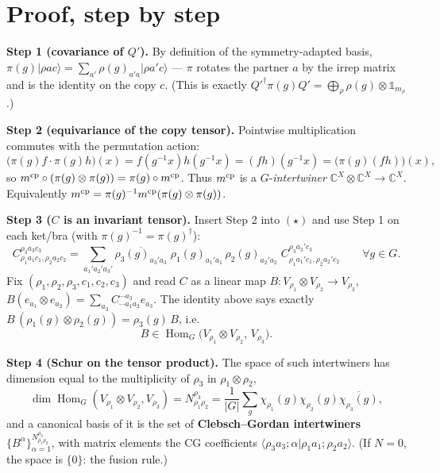 \documentclass[11pt]{article}
\newcommand{\ket}[1]{\lvert #1\rangle}\newcommand{\bra}[1]{\langle #1\rvert}
\newcommand{\Hom}{\operatorname{Hom}}\newcommand{\C}{\mathbb C}
\theoremstyle{plain}\newtheorem*{thm}{Theorem}\newtheorem*{lem}{Lemma}
\begin{document}
\section{Proof, step by step}

\textbf{Step 1 (covariance of $Q'$).} By definition of the symmetry-adapted basis,
$\pi(g)\ket{\rho a c}=\sum_{a'}\rho(g)_{a'a}\ket{\rho a' c}$ --- $\pi$ rotates the partner $a$ by the
irrep matrix and is the identity on the copy $c$. (This is exactly $Q'^\dagger\pi(g)Q'=\bigoplus_\rho
\rho(g)\otimes\mathbb 1_{m_\rho}$.)

\textbf{Step 2 (equivariance of the copy tensor).} Pointwise multiplication commutes with the
permutation action:
\[
   \big(\pi(g)f\cdot\pi(g)h\big)(x)=f(g^{-1}x)h(g^{-1}x)=(fh)(g^{-1}x)=\big(\pi(g)(fh)\big)(x),
\]
so $m^{\rm cp}\circ(\pi(g)\otimes\pi(g))=\pi(g)\circ m^{\rm cp}$. Thus $m^{\rm cp}$ is a
$G$-\emph{intertwiner} $\C^X\otimes\C^X\to\C^X$. Equivalently $m^{\rm cp}=\pi(g)^{-1}m^{\rm cp}(\pi(g)\otimes\pi(g))$.

\textbf{Step 3 ($C$ is an invariant tensor).} Insert Step 2 into $(\star)$ and use Step 1 on each
ket/bra (with $\pi(g)^{-1}=\pi(g)^\dagger$):
\[
   C^{\rho_3 a_3 c_3}_{\rho_1 a_1 c_1,\rho_2 a_2 c_2}
   =\sum_{a_1'a_2'a_3'}\overline{\rho_3(g)_{a_3'a_3}}\;\rho_1(g)_{a_1'a_1}\,\rho_2(g)_{a_2'a_2}\;
   C^{\rho_3 a_3' c_3}_{\rho_1 a_1' c_1,\rho_2 a_2' c_2}\qquad\forall g\in G.
\]
Fix $(\rho_1,\rho_2,\rho_3,c_1,c_2,c_3)$ and read $C$ as a linear map
$B:V_{\rho_1}\otimes V_{\rho_2}\to V_{\rho_3}$, $B(e_{a_1}\otimes e_{a_2})=\sum_{a_3}C^{\cdots a_3}_{\cdots a_1 a_2}e_{a_3}$.
The identity above says exactly $B\,(\rho_1(g)\otimes\rho_2(g))=\rho_3(g)\,B$, i.e.
\[
   B\in\Hom_G\!\big(V_{\rho_1}\otimes V_{\rho_2},\,V_{\rho_3}\big).
\]

\textbf{Step 4 (Schur on the tensor product).} The space of such intertwiners has dimension equal to
the multiplicity of $\rho_3$ in $\rho_1\otimes\rho_2$,
\[
   \dim\Hom_G(V_{\rho_1}\otimes V_{\rho_2},V_{\rho_3})=N^{\rho_3}_{\rho_1\rho_2}
   =\frac1{|G|}\sum_{g}\chi_{\rho_1}(g)\chi_{\rho_2}(g)\overline{\chi_{\rho_3}(g)},
\]
and a canonical basis of it is the set of \textbf{Clebsch--Gordan intertwiners}
$\{B^\alpha\}_{\alpha=1}^{N^{\rho_3}_{\rho_1\rho_2}}$, with matrix elements the CG coefficients
$\langle\rho_3 a_3;\alpha|\rho_1 a_1;\rho_2 a_2\rangle$. (If $N=0$, the space is $\{0\}$: the fusion rule.)
\end{document}
